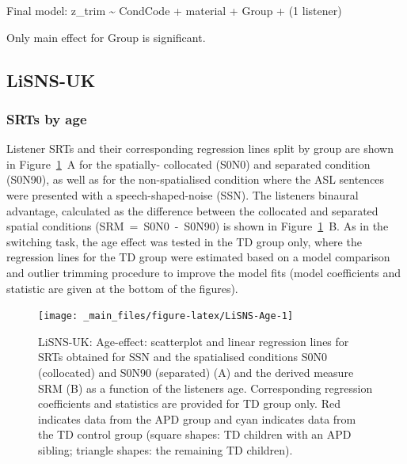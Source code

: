 \documentclass[a4paper, twoside]{templates/ociamthesis}
\begin{document}
Final model: z\_trim \textasciitilde{} CondCode + material + Group + (1 \textbar{} listener)

Only main effect for Group is significant.

\hypertarget{lisns-uk}{%
\subsection{LiSNS-UK}\label{lisns-uk}}

\hypertarget{srts-by-age}{%
\subsubsection*{SRTs by age}\label{srts-by-age}}

Listener SRTs and their corresponding regression lines split by group are shown in Figure~\ref{fig:LiSNS-Age}~A for the spatially- collocated (S0N0) and separated condition (S0N90), as well as for the non-spatialised condition where the ASL sentences were presented with a speech-shaped-noise (SSN). The listeners binaural advantage, calculated as the difference between the collocated and separated spatial conditions (SRM~=~S0N0~-~S0N90) is shown in Figure~\ref{fig:LiSNS-Age}~B. As in the switching task, the age effect was tested in the TD group only, where the regression lines for the TD group were estimated based on a model comparison and outlier trimming procedure to improve the model fits (model coefficients and statistic are given at the bottom of the figures).\\

\begin{figure}

{\centering \texttt{[image: \_main\_files/figure-latex/LiSNS-Age-1]} 

}

\caption{LiSNS-UK: Age-effect: scatterplot and linear regression lines for SRTs obtained for SSN and the spatialised conditions S0N0 (collocated) and S0N90 (separated) (A) and the derived measure SRM (B) as a function of the listeners age. Corresponding regression coefficients and statistics are provided for TD group only. Red indicates data from the APD group and cyan indicates data from the TD control group (square shapes: TD children with an APD sibling; triangle shapes: the remaining TD children).}\label{fig:LiSNS-Age}
\end{figure}
\end{document}
